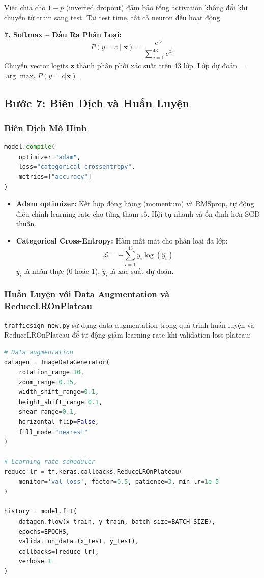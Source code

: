 \documentclass[12pt,a4paper]{article}
\begin{document}
Việc chia cho $1-p$ (inverted dropout) đảm bảo tổng activation không đổi khi chuyển từ train sang test. Tại test time, tất cả neuron đều hoạt động.

\textbf{7. Softmax -- Đầu Ra Phân Loại:}
\begin{equation}
    P(y = c \mid \mathbf{x}) = \frac{e^{z_c}}{\sum_{j=1}^{43} e^{z_j}}
\end{equation}
Chuyển vector logits $\mathbf{z}$ thành phân phối xác suất trên 43 lớp. Lớp dự đoán = $\arg\max_c P(y=c|\mathbf{x})$.

\subsection{Bước 7: Biên Dịch và Huấn Luyện}

\subsubsection*{Biên Dịch Mô Hình}
\begin{lstlisting}[language=Python]
model.compile(
    optimizer="adam",
    loss="categorical_crossentropy",
    metrics=["accuracy"]
)
\end{lstlisting}

\begin{itemize}
    \item \textbf{Adam optimizer:} Kết hợp động lượng (momentum) và RMSprop, tự động điều chỉnh learning rate cho từng tham số. Hội tụ nhanh và ổn định hơn SGD thuần.
    \item \textbf{Categorical Cross-Entropy:} Hàm mất mát cho phân loại đa lớp:
    \begin{equation}
        \mathcal{L} = -\sum_{i=1}^{43} y_i \log(\hat{y}_i)
    \end{equation}
    $y_i$ là nhãn thực (0 hoặc 1), $\hat{y}_i$ là xác suất dự đoán.
\end{itemize}

\subsubsection*{Huấn Luyện với Data Augmentation và ReduceLROnPlateau}

\texttt{trafficsign\_new.py} sử dụng data augmentation trong quá trình huấn luyện và ReduceLROnPlateau để tự động giảm learning rate khi validation loss plateau:

\begin{lstlisting}[language=Python, caption={Huấn luyện với data augmentation và ReduceLROnPlateau.}, label=lst:training]
# Data augmentation
datagen = ImageDataGenerator(
    rotation_range=10,
    zoom_range=0.15,
    width_shift_range=0.1,
    height_shift_range=0.1,
    shear_range=0.1,
    horizontal_flip=False,
    fill_mode="nearest"
)

# Learning rate scheduler
reduce_lr = tf.keras.callbacks.ReduceLROnPlateau(
    monitor='val_loss', factor=0.5, patience=3, min_lr=1e-5
)

history = model.fit(
    datagen.flow(x_train, y_train, batch_size=BATCH_SIZE),
    epochs=EPOCHS,
    validation_data=(x_test, y_test),
    callbacks=[reduce_lr],
    verbose=1
)
\end{lstlisting}
\end{document}
